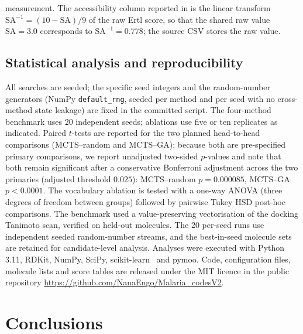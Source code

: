 \documentclass[10pt,a4paper]{article}
\begin{document}
measurement. The accessibility column reported in  is the linear transform $\mathrm{SA}^{-1} = (10 - \mathrm{SA})/9$ of the raw Ertl score, so that the shared raw value $\mathrm{SA} = \num{3.0}$ corresponds to $\mathrm{SA}^{-1} = \num{0.778}$; the source CSV stores the raw value.

\subsection{Statistical analysis and reproducibility}

All searches are seeded; the specific seed integers and the random-number generators (NumPy \texttt{default\_rng}, seeded per method and per seed with no cross-method state leakage) are fixed in the committed script. The four-method benchmark uses \num{20} independent seeds; ablations use five or ten replicates as indicated. Paired $t$-tests are reported for the two planned head-to-head comparisons (MCTS--random and MCTS--GA); because both are pre-specified primary comparisons, we report unadjusted two-sided $p$-values and note that both remain significant after a conservative Bonferroni adjustment across the two primaries (adjusted threshold $\num{0.025}$): MCTS--random $p = \num{0.000085}$, MCTS--GA $p<\num{0.0001}$. The vocabulary ablation is tested with a one-way ANOVA (three degrees of freedom between groups) followed by pairwise Tukey HSD post-hoc comparisons. The benchmark used a value-preserving vectorisation of the docking Tanimoto scan, verified on held-out molecules. The \num{20} per-seed runs use independent seeded random-number streams, and the best-in-seed molecule sets are retained for candidate-level analysis. Analyses were executed with Python 3.11, RDKit, NumPy, SciPy, scikit-learn~\citep{Pedregosa2011} and pymoo. Code, configuration files, molecule lists and score tables are released under the MIT licence in the public repository \url{https://github.com/NanaEngo/Malaria_codesV2}.

\section{Conclusions}
\end{document}
